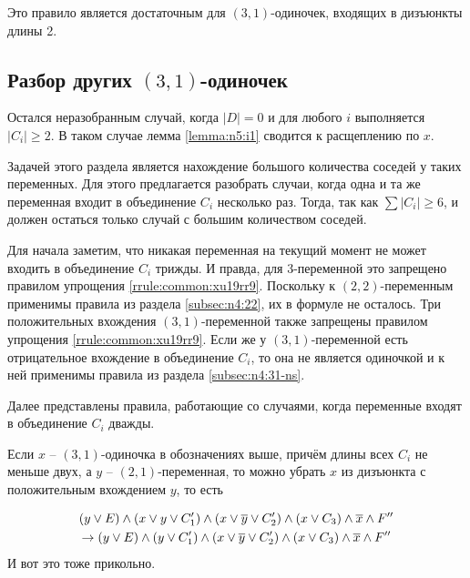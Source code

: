 Это правило является достаточным для $(3,1)$-одиночек, входящих в дизъюнкты длины 2.

\subsection{Разбор других $(3,1)$-одиночек}
\label{subsec:n4:31-others}

Остался неразобранным случай, когда $|D| = 0$ и для любого $i$ выполняется $|C_i| \geq 2$.
В таком случае лемма \ref{lemma:n5:i1} сводится к расщеплению по $x$.

Задачей этого раздела является нахождение большого количества соседей у таких переменных.
Для этого предлагается разобрать случаи, когда одна и та же переменная входит в объединение $C_i$ несколько раз.
Тогда, так как $\sum |C_i| \geq 6$, и должен остаться только случай с большим количеством соседей.

Для начала заметим, что никакая переменная на текущий момент не может входить в объединение $C_i$ трижды. И правда, для 3-переменной это запрещено правилом упрощения \ref{rrule:common:xu19rr9}. Поскольку к $(2,2)$-переменным применимы правила из раздела \ref{subsec:n4:22}, их в формуле не осталось. Три положительных вхождения $(3,1)$-переменной также запрещены правилом упрощения \ref{rrule:common:xu19rr9}. Если же у $(3,1)$-переменной есть отрицательное вхождение в объединение $C_i$, то она не является одиночкой и к ней применимы правила из раздела \ref{subsec:n4:31-ns}.

Далее представлены правила, работающие со случаями, когда переменные входят в объединение $C_i$ дважды.

\begin{rrule}
 Если $x$ -- $(3,1)$-одиночка в обозначениях выше, причём длины всех $C_i$ не меньше двух, а $y$ -- $(2,1)$-переменная, то можно убрать $x$ из дизъюнкта с положительным вхождением $y$, то есть

 \begin{gather*}
  (y \vee E) \wedge (x \vee y \vee C_1') \wedge (x \vee \overline{y} \vee C_2') \wedge (x \vee C_3) \wedge \overline{x} \wedge F''\\
  \rightarrow
  (y \vee E) \wedge (y \vee C_1') \wedge (x \vee \overline{y} \vee C_2') \wedge (x \vee C_3) \wedge \overline{x} \wedge F''
 \end{gather*}
 {\color{white} И вот это тоже прикольно.}
 \label{rrule:n4:31:3v-2}
\end{rrule}

